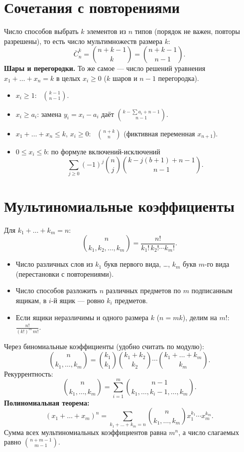 \section{Сочетания с повторениями}
Число способов выбрать $k$ элементов из $n$ типов (порядок не важен, повторы разрешены), то есть число мультимножеств размера $k$:
\[ \bar C_n^k = \binom{n+k-1}{k} = \binom{n+k-1}{n-1}. \]
\textbf{Шары и перегородки.} То же самое --- число решений уравнения $x_1 + \dots + x_n = k$ в целых $x_i \ge 0$ ($k$ шаров и $n-1$ перегородка).
\begin{itemize}
	\item $x_i \ge 1$: \ $\binom{k-1}{n-1}$.
	\item $x_i \ge a_i$: замена $y_i = x_i - a_i$ даёт $\binom{k - \sum a_i + n - 1}{n-1}$.
	\item $x_1 + \dots + x_n \le k$, $x_i \ge 0$: \ $\binom{n+k}{n}$ (фиктивная переменная $x_{n+1}$).
	\item $0 \le x_i \le b$: по формуле включений-исключений
	\[ \sum_{j \ge 0} (-1)^j \binom{n}{j} \binom{k - j(b+1) + n - 1}{n-1}. \]
\end{itemize}

\section{Мультиномиальные коэффициенты}
Для $k_1 + \dots + k_m = n$:
\[ \binom{n}{k_1, k_2, \dots, k_m} = \frac{n!}{k_1!\,k_2!\cdots k_m!}. \]
\begin{itemize}
	\item Число различных слов из $k_1$ букв первого вида, \dots, $k_m$ букв $m$-го вида (перестановки с повторениями).
	\item Число способов разложить $n$ различных предметов по $m$ подписанным ящикам, в $i$-й ящик --- ровно $k_i$ предметов.
	\item Если ящики неразличимы и одного размера $k$ ($n = mk$), делим на $m!$: \ $\frac{n!}{(k!)^m\, m!}$.
\end{itemize}
Через биномиальные коэффициенты (удобно считать по модулю):
\[ \binom{n}{k_1, \dots, k_m} = \binom{k_1}{k_1}\binom{k_1+k_2}{k_2}\cdots\binom{k_1+\dots+k_m}{k_m}. \]
Рекуррентность:
\[ \binom{n}{k_1, \dots, k_m} = \sum_{i=1}^{m} \binom{n-1}{k_1, \dots, k_i - 1, \dots, k_m}. \]
\textbf{Полиномиальная теорема:}
\[ (x_1 + \dots + x_m)^n = \sum_{k_1 + \dots + k_m = n} \binom{n}{k_1, \dots, k_m} x_1^{k_1} \cdots x_m^{k_m}. \]
Сумма всех мультиномиальных коэффициентов равна $m^n$, а число слагаемых равно $\binom{n+m-1}{m-1}$.

